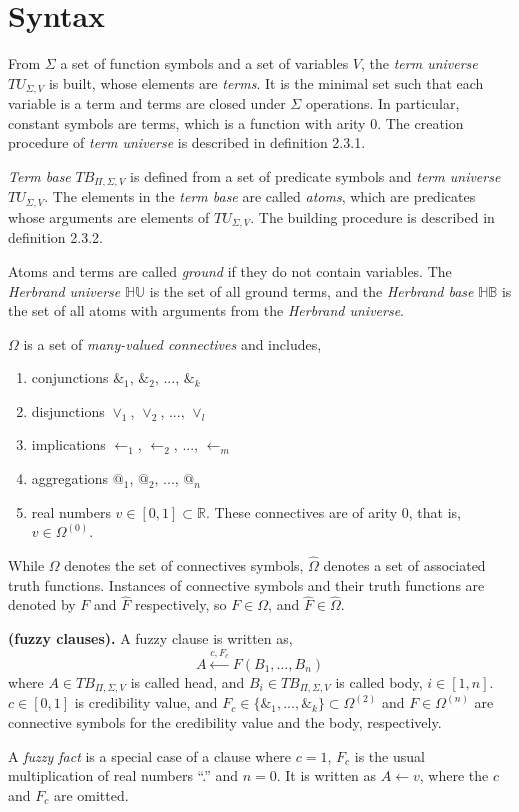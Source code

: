 \section{Syntax}
\label{sec:FuzzyFrameworkSyntax}
From $\Sigma$ a set of function symbols and a set of variables $V$, the \textit{term universe} $TU_{\Sigma,V}$ is built, whose elements are \textit{terms}. It is the minimal set such that each variable is a term and terms are closed under $\Sigma$ operations. In particular, constant symbols are terms, which is a function with arity $0$. The creation procedure of \textit{term universe} is described in definition 2.3.1.

\textit{Term base} $TB_{\Pi,\Sigma,V}$ is defined from a set of predicate symbols and \textit{term universe} $TU_{\Sigma,V}$. The elements in the \textit{term base} are called \textit{atoms}, which are predicates whose arguments are elements of $TU_{\Sigma,V}$. The building procedure is described in definition 2.3.2.

Atoms and terms are called \textit{ground} if they do not contain variables. The \textit{Herbrand universe} $\mathbb{HU}$ is the set of all ground terms, and the \textit{Herbrand base} $\mathbb{HB}$ is the set of all atoms with arguments from the \textit{Herbrand universe}.

$\Omega$ is a set of \textit{many-valued connectives} and includes,
\begin{enumerate}
 \item conjunctions $\&_1$, $\&_2$, ..., $\&_k$ 
 \item disjunctions $\vee_1$, $\vee_2$, ..., $\vee_l$
 \item implications $\leftarrow_1$, $\leftarrow_2$, ..., $\leftarrow_m$ 
 \item aggregations $@_1$, $@_2$, ..., $@_n$
 \item real numbers $v\in[0,1]\subset \mathbb{R}$. These connectives are of arity $0$, that is, $v\in\Omega^{(0)}$.
\end{enumerate}
While $\Omega$ denotes the set of connectives symbols, $\hat{\Omega}$ denotes a set of associated truth functions. Instances of connective symbols and their truth functions are denoted by $F$ and $\hat{F}$ respectively, so $F \in \Omega$, and $\hat{F} \in \hat{\Omega}$. 

\begin{defin}\textbf{(fuzzy clauses).}
\label{def:FuzzyClauses}
A fuzzy clause is written as,
\[A \stackrel{c,F_c}{\leftarrow} F(B_1,...,B_n)\]
where $A \in TB_{\Pi,\Sigma,V}$ is called head, and $B_i \in TB_{\Pi,\Sigma,V}$ is called body, $i \in [1,n]$. $c \in [0,1]$ is credibility value, and $F_c \in \{\&_1,...,\&_k\}\subset\Omega^{(2)}$ and $F\in\Omega^{(n)}$ are connective symbols for the credibility value and the body, respectively. 

A \textit{fuzzy fact} is a special case of a clause where $c=1$, $F_c$ is the usual multiplication of real numbers ``.'' and $n=0$. It is written as $A \leftarrow v$, where the $c$ and $F_c$ are omitted.
\end{defin}

